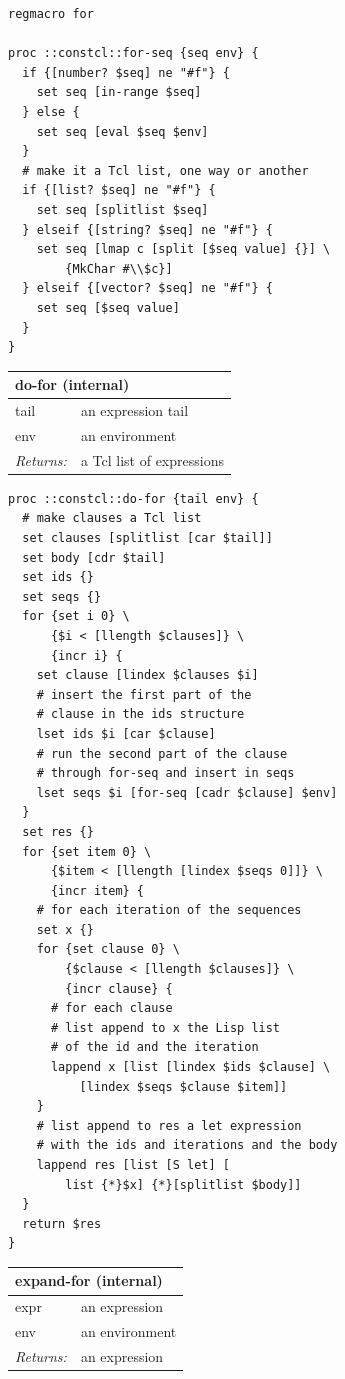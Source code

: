 \documentclass[twoside,9pt]{report}
\begin{document}
\noindent\makebox[\linewidth]{\rule{\linewidth}{0.4pt}}
\begin{lstlisting}
regmacro for
 
proc ::constcl::for-seq {seq env} {
  if {[number? $seq] ne "#f"} {
    set seq [in-range $seq]
  } else {
    set seq [eval $seq $env]
  }
  # make it a Tcl list, one way or another
  if {[list? $seq] ne "#f"} {
    set seq [splitlist $seq]
  } elseif {[string? $seq] ne "#f"} { 
    set seq [lmap c [split [$seq value] {}] \
        {MkChar #\\$c}]
  } elseif {[vector? $seq] ne "#f"} {
    set seq [$seq value]
  }
}
\end{lstlisting}
\noindent\makebox[\linewidth]{\rule{\linewidth}{0.4pt}}
\begin{tabular}{ |l l| }
\hline
\multicolumn{2}{|l|}{do-for (internal)} \\
\hline
tail & an expression tail \\
env & an environment \\
\textit{Returns:} & a Tcl list of expressions \\
\hline
\end{tabular}

\noindent\makebox[\linewidth]{\rule{\linewidth}{0.4pt}}
\begin{lstlisting}
proc ::constcl::do-for {tail env} {
  # make clauses a Tcl list
  set clauses [splitlist [car $tail]]
  set body [cdr $tail]
  set ids {}
  set seqs {}
  for {set i 0} \
      {$i < [llength $clauses]} \
      {incr i} {
    set clause [lindex $clauses $i]
    # insert the first part of the
    # clause in the ids structure
    lset ids $i [car $clause]
    # run the second part of the clause
    # through for-seq and insert in seqs
    lset seqs $i [for-seq [cadr $clause] $env]
  }
  set res {}
  for {set item 0} \
      {$item < [llength [lindex $seqs 0]]} \
      {incr item} {
    # for each iteration of the sequences
    set x {}
    for {set clause 0} \
        {$clause < [llength $clauses]} \
        {incr clause} {
      # for each clause
      # list append to x the Lisp list
      # of the id and the iteration
      lappend x [list [lindex $ids $clause] \
          [lindex $seqs $clause $item]]
    }
    # list append to res a let expression
    # with the ids and iterations and the body
    lappend res [list [S let] [
        list {*}$x] {*}[splitlist $body]]
  }
  return $res
}
\end{lstlisting}
\noindent\makebox[\linewidth]{\rule{\linewidth}{0.4pt}}
\begin{tabular}{ |l l| }
\hline
\multicolumn{2}{|l|}{expand-for (internal)} \\
\hline
expr & an expression \\
env & an environment \\
\textit{Returns:} & an expression \\
\hline
\end{tabular}
\end{document}
